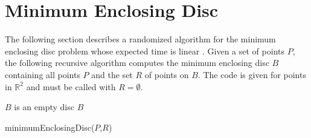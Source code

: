\documentclass[a4paper, 11pt]{article}
\begin{document}
\appendix
\section{Minimum Enclosing Disc}

The following section describes a randomized algorithm for the minimum
enclosing disc problem whose expected time is linear
\cite{Welzl1991}.  Given a set of points $P$, the following recursive
algorithm computes the minimum enclosing disc $B$ containing all
points $P$ and the set $R$ of points on $B$. The code is given for
points in $\mathbb{R}^2$ and must be called with $R=\emptyset$.


\begin{algorithm}[Hhtbp]
     {
        {$B$ is an empty disc \Return $B$\;}
      }
  
  \caption{minimumEnclosingDisc($P$,$R$)}
  \label{algo:main}
\end{algorithm}






\end{document}
